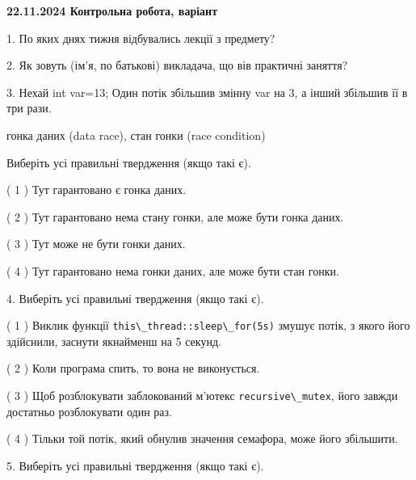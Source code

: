 \documentclass[12pt, ukrainian]{article}
\def\code#1{\Verb!#1!}
\begin{document}
\vspace{4mm}
\newpage
\begin {large}

\textbf{22.11.2024 Контрольна робота, варіант  }\par


{
1. По яких днях тижня відбувались лекції з предмету?



\vspace{5mm}
2. Як зовуть (ім'я, по батькові) викладача, що вів практичні заняття?



\vspace{5mm}
3. Нехай int var=13; Один потік збільшив змінну var на 3, а інший збільшив її в три рази.

гонка даних (data race), стан гонки (race condition)

Виберіть усі правильні твердження (якщо такі є).\par
\vspace{2mm}
( 1 ) Тут гарантовано є гонка даних.%

( 2 ) Тут гарантовано нема стану гонки, але може бути гонка даних.%

( 3 ) Тут може не бути гонки даних.%

( 4 ) Тут гарантовано нема гонки даних, але може бути стан гонки.%


\vspace{5mm}
4. Виберіть усі правильні твердження (якщо такі є).\par
\vspace{2mm}

( 1 ) Виклик функції \code{this\_thread::sleep\_for(5s)} змушує потік, з якого його здійснили, заснути якнайменш на 5 секунд.%

( 2 ) Коли програма спить, то вона не виконується.%

( 3 ) Щоб розблокувати заблокований м’ютекс \code{recursive\_mutex}, його завжди достатньо розблокувати один раз.%

( 4 ) Тільки той потік, який обнулив значення семафора, може його збільшити.%


\vspace{5mm}
5. Виберіть усі правильні твердження (якщо такі є).\par
\vspace{2mm}

}
\end{large}
\end{document}
